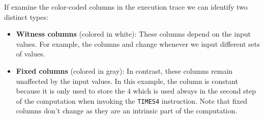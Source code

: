 If examine the color-coded columns in the execution trace we can identify two distinct types:

\begin{itemize}

\item \textbf{Witness columns} (colored in white): These columns depend on the input values. For example, the columns \A and \B change whenever we input different sets of values.

\item \textbf{Fixed columns} (colored in gray): In contrast, these columns remain unaffected by the input values. In this example, the column \C is constant because it is only used to store the $4$ which is used always in the second step of the computation when invoking the \texttt{TIMES4} instruction. Note that fixed columns don’t change as they are an intrinsic part of the
computation.

\end{itemize}



